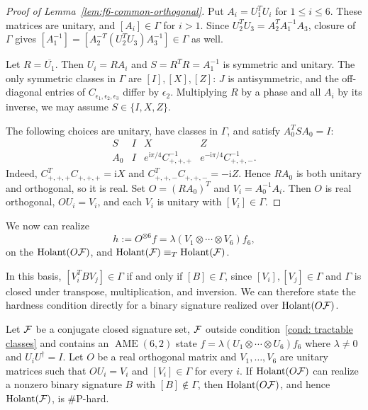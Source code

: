 \begin{proof}[Proof of Lemma~\ref{lem:f6-common-orthogonal}]
Put $A_i=U_1^TU_i$ for $1\le i\le6$. These matrices are unitary,
and $[A_i]\in\Gamma$ for $i>1$. Since
$U_2^TU_3=A_2^TA_1^{-1}A_3$, closure of $\Gamma$ gives
$[A_1^{-1}]=[A_2^{-T}(U_2^TU_3)A_3^{-1}]\in\Gamma$ as well.

Let $R=\overline{U_1}$. Then $U_i=RA_i$ and
$S=R^TR=A_1^{-1}$ is symmetric and unitary.
The only symmetric classes in $\Gamma$ are $[I],[X],[Z]$:
$J$ is antisymmetric, and the off-diagonal entries of
$C_{\epsilon_1,\epsilon_2,\epsilon_3}$ differ by $\epsilon_2$.
Multiplying $R$ by a phase and all $A_i$ by its inverse, we may
assume $S\in\{I,X,Z\}$.

The following choices are unitary, have classes in $\Gamma$, and
satisfy $A_0^TSA_0=I$:
\[
\begin{array}{c|ccc}
S&I&X&Z\\ \hline
A_0&I&e^{\mathrm i\pi/4}C_{+,+,+}^{-1}
       &e^{-\mathrm i\pi/4}C_{+,+,-}^{-1}.
\end{array}
\]
Indeed, $C_{+,+,+}^TC_{+,+,+}=\mathrm iX$ and
$C_{+,+,-}^TC_{+,+,-}=-\mathrm iZ$.
Hence $RA_0$ is both unitary and orthogonal, so it is real.
Set $O=(RA_0)^T$ and $V_i=A_0^{-1}A_i$.
Then $O$ is real orthogonal, $OU_i=V_i$, and each $V_i$ is unitary
with $[V_i]\in\Gamma$.
\end{proof}

We now can realize
\begin{equation}
 h:=O^{\otimes6}f=\lambda(V_1\otimes\cdots\otimes V_6)f_6,
 \label{eq:f6-transformed-signature}
\end{equation}
on the $\operatorname{Holant}(O\mathcal{F})$, and 
$\operatorname{Holant}(\mathcal F)\equiv_T\operatorname{Holant}(\mathcal F)$.

In this basis, $[V_i^TBV_j]\in\Gamma$ if and only if $[B]\in\Gamma$,
since $[V_i],[V_j]\in\Gamma$ and $\Gamma$ is closed under transpose,
multiplication, and inversion. We can therefore state the hardness
condition directly for a binary signature realized over $\operatorname{Holant}(O\mathcal F)$.

\begin{lemma}
\label{lem:f6-nongamma-binary}
Let $\mathcal{F}$ be a conjugate closed signature set, $\mathcal{F}$ outside condition~\eqref{cond: tractable classes} and contains an $\operatorname{AME}(6,2)$ state $f=\lambda(U_1\otimes\cdots \otimes U_6)f_6$ where $\lambda\neq 0$ and $U_iU^\dagger=I$.
Let $O$ be a real orthogonal matrix and 
$V_1,\ldots,V_6$ are unitary matrices such that $OU_i=V_i$ and $[V_i]\in\Gamma$ for
every $i$. If $\operatorname{Holant}(O\mathcal{F})$ can realize a nonzero binary signature $B$
with $[B]\notin\Gamma$, then $\operatorname{Holant}(O\mathcal F)$, and hence
$\operatorname{Holant}(\mathcal F)$, is $\#\mathrm P$-hard.
\end{lemma}

